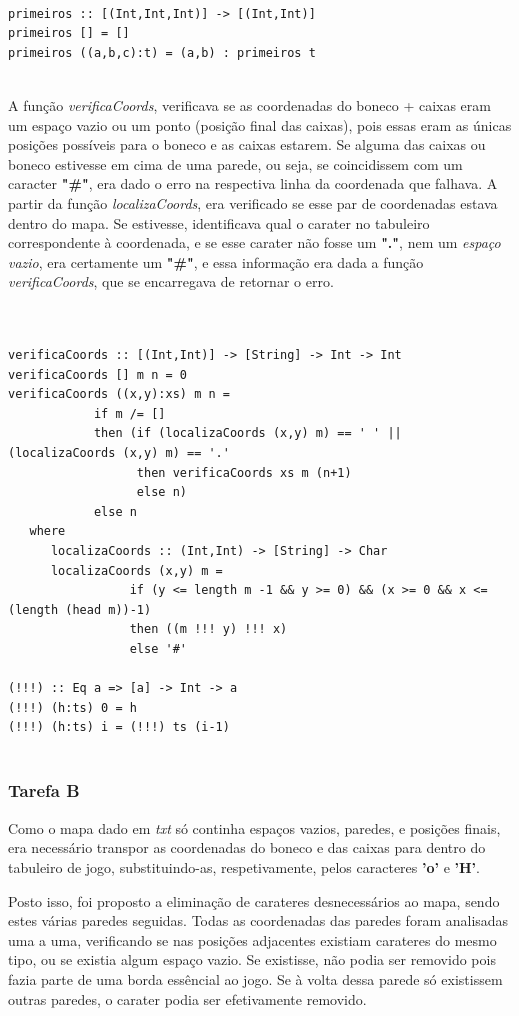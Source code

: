 \documentclass[a4paper]{article}
\begin{document}
\begin{Verbatim}

primeiros :: [(Int,Int,Int)] -> [(Int,Int)]
primeiros [] = []
primeiros ((a,b,c):t) = (a,b) : primeiros t 


\end{Verbatim}

A função \textit{verificaCoords}, verificava se as coordenadas do boneco + caixas eram um espaço vazio ou um ponto (posição final das caixas), pois essas eram as únicas posições possíveis para o boneco e as caixas estarem. Se alguma das caixas ou boneco estivesse em cima de uma parede, ou seja, se coincidissem com um caracter \textbf{"\#"}, era dado o erro na respectiva linha da coordenada que falhava. A partir da função \textit{localizaCoords}, era verificado se esse par de coordenadas estava dentro do mapa. Se estivesse, identificava qual o carater no tabuleiro correspondente à coordenada, e se esse carater não fosse um \textbf{"."}, nem um \textit{espaço vazio}, era certamente um \textbf{"\#"}, e essa informação era dada a função \textit{verificaCoords}, que se encarregava de retornar o erro. 


 
\begin{Verbatim}


verificaCoords :: [(Int,Int)] -> [String] -> Int -> Int
verificaCoords [] m n = 0
verificaCoords ((x,y):xs) m n = 
            if m /= [] 
            then (if (localizaCoords (x,y) m) == ' ' || (localizaCoords (x,y) m) == '.'
                  then verificaCoords xs m (n+1) 
                  else n)
            else n 
   where                              
      localizaCoords :: (Int,Int) -> [String] -> Char
      localizaCoords (x,y) m = 
            	 if (y <= length m -1 && y >= 0) && (x >= 0 && x <= (length (head m))-1) 
            	 then ((m !!! y) !!! x)
            	 else '#'
                                  
(!!!) :: Eq a => [a] -> Int -> a
(!!!) (h:ts) 0 = h
(!!!) (h:ts) i = (!!!) ts (i-1)


\end{Verbatim}
\newpage

\subsubsection{Tarefa B}

Como o mapa dado em \textit{txt} só continha espaços vazios, paredes, e posições finais, era necessário transpor as coordenadas do boneco e das caixas para dentro do tabuleiro de jogo, substituindo-as, respetivamente, pelos caracteres \textbf{'o'} e \textbf{'H'}. \par
Posto isso, foi proposto a eliminação de carateres desnecessários ao mapa, sendo estes várias paredes seguidas. Todas as coordenadas das paredes foram analisadas uma a uma, verificando se nas posições adjacentes existiam carateres do mesmo tipo, ou se existia algum espaço vazio. Se existisse, não podia ser removido pois fazia parte de uma borda essêncial ao jogo. Se à volta dessa parede só existissem outras paredes, o carater podia ser efetivamente removido. \par
\end{document}
